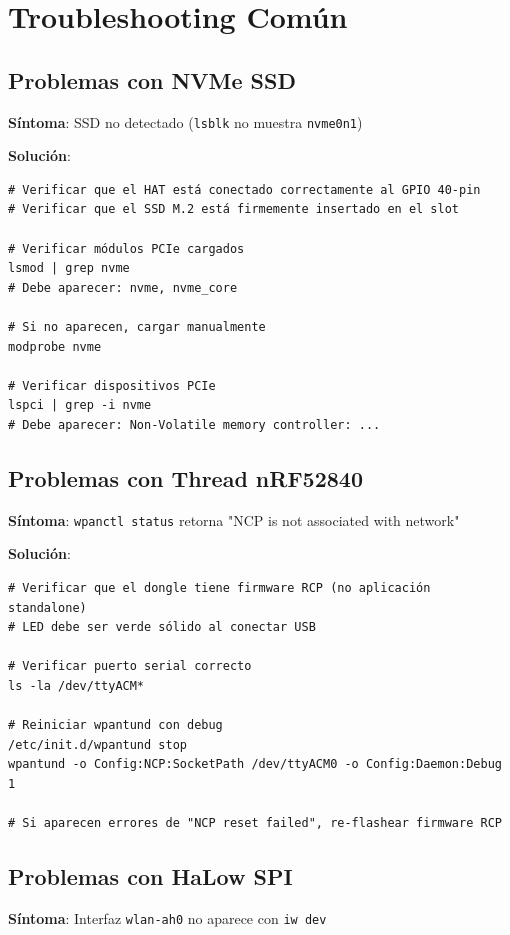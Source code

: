 \section{Troubleshooting Común}

\subsection{Problemas con NVMe SSD}

\textbf{Síntoma}: SSD no detectado (\texttt{lsblk} no muestra \texttt{nvme0n1})

\textbf{Solución}:
\begin{verbatim}
# Verificar que el HAT está conectado correctamente al GPIO 40-pin
# Verificar que el SSD M.2 está firmemente insertado en el slot

# Verificar módulos PCIe cargados
lsmod | grep nvme
# Debe aparecer: nvme, nvme_core

# Si no aparecen, cargar manualmente
modprobe nvme

# Verificar dispositivos PCIe
lspci | grep -i nvme
# Debe aparecer: Non-Volatile memory controller: ...
\end{verbatim}

\subsection{Problemas con Thread nRF52840}

\textbf{Síntoma}: \texttt{wpanctl status} retorna "NCP is not associated with network"

\textbf{Solución}:
\begin{verbatim}
# Verificar que el dongle tiene firmware RCP (no aplicación standalone)
# LED debe ser verde sólido al conectar USB

# Verificar puerto serial correcto
ls -la /dev/ttyACM*

# Reiniciar wpantund con debug
/etc/init.d/wpantund stop
wpantund -o Config:NCP:SocketPath /dev/ttyACM0 -o Config:Daemon:Debug 1

# Si aparecen errores de "NCP reset failed", re-flashear firmware RCP
\end{verbatim}

\subsection{Problemas con HaLow SPI}

\textbf{Síntoma}: Interfaz \texttt{wlan-ah0} no aparece con \texttt{iw dev}

